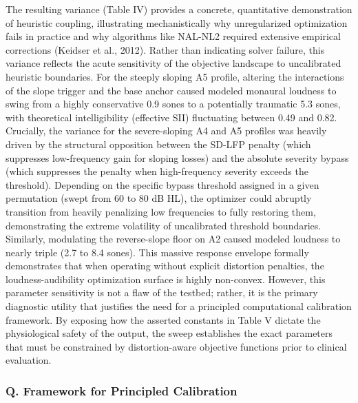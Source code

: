 \documentclass[
  12pt,
]{article}
\begin{document}
The resulting variance (Table IV) provides a concrete, quantitative
demonstration of heuristic coupling, illustrating mechanistically why
unregularized optimization fails in practice and why algorithms like
NAL-NL2 required extensive empirical corrections (Keidser et al., 2012).
Rather than indicating solver failure, this variance reflects the acute
sensitivity of the objective landscape to uncalibrated heuristic
boundaries. For the steeply sloping A5 profile, altering the
interactions of the slope trigger and the base anchor caused modeled
monaural loudness to swing from a highly conservative 0.9 sones to a
potentially traumatic 5.3 sones, with theoretical intelligibility
(effective SII) fluctuating between 0.49 and 0.82. Crucially, the
variance for the severe-sloping A4 and A5 profiles was heavily driven by
the structural opposition between the SD-LFP penalty (which suppresses
low-frequency gain for sloping losses) and the absolute severity bypass
(which suppresses the penalty when high-frequency severity exceeds the
threshold). Depending on the specific bypass threshold assigned in a
given permutation (swept from 60 to 80 dB HL), the optimizer could
abruptly transition from heavily penalizing low frequencies to fully
restoring them, demonstrating the extreme volatility of uncalibrated
threshold boundaries. Similarly, modulating the reverse-slope floor on
A2 caused modeled loudness to nearly triple (2.7 to 8.4 sones). This
massive response envelope formally demonstrates that when operating
without explicit distortion penalties, the loudness-audibility
optimization surface is highly non-convex. However, this parameter
sensitivity is not a flaw of the testbed; rather, it is the primary
diagnostic utility that justifies the need for a principled
computational calibration framework. By exposing how the asserted
constants in Table V dictate the physiological safety of the output, the
sweep establishes the exact parameters that must be constrained by
distortion-aware objective functions prior to clinical evaluation.

\subsubsection{Q. Framework for Principled
Calibration}\label{q.-framework-for-principled-calibration}
\end{document}
